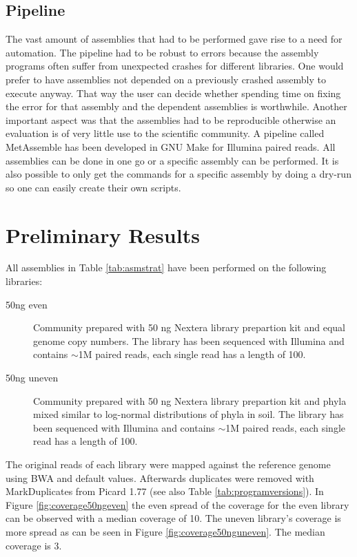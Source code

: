 \documentclass[a4paper,12pt]{article}
\begin{document}
\subsection{Pipeline} The vast amount of assemblies that had to be performed
gave rise to a need for automation. The pipeline had to be robust to errors
because the assembly programs often suffer from unexpected crashes for
different libraries. One would prefer to have assemblies not depended on a
previously crashed assembly to execute anyway. That way the user can decide
whether spending time on fixing the error for that assembly and the dependent
assemblies is worthwhile. Another important aspect was that the assemblies had
to be reproducible otherwise an evaluation is of very little use to the
scientific community. A pipeline called MetAssemble has been developed in GNU
Make for Illumina paired reads. All assemblies can be done in one go or a
specific assembly can be performed. It is also possible to only get the
commands for a specific assembly by doing a dry-run so one can easily create
their own scripts.

\section{Preliminary Results}
All assemblies in Table \ref{tab:asmstrat} have been performed on the
following libraries:
\begin{description}
\item[50ng even] Community prepared with 50 ng Nextera library prepartion kit and equal
genome copy numbers. The library has been sequenced with Illumina and contains $\sim$1M paired reads, each single read has a length of 100.
\item[50ng uneven] Community prepared with 50 ng Nextera library prepartion kit
and phyla mixed similar to log-normal distributions of phyla in soil. The
library has been sequenced with Illumina and contains $\sim$1M paired reads,
each single read has a length of 100.
\end{description}

The original reads of each library were mapped against the reference genome
using BWA \cite{Li20080505} and default values. Afterwards duplicates were
removed with MarkDuplicates from Picard 1.77 (see also Table
\ref{tab:programversions}). In Figure \ref{fig:coverage50ngeven} the even
spread of the coverage for the even library can be observed with a median
coverage of 10. The uneven library's coverage is more spread as can be seen in
Figure \ref{fig:coverage50nguneven}. The median coverage is 3.\\
\end{document}
